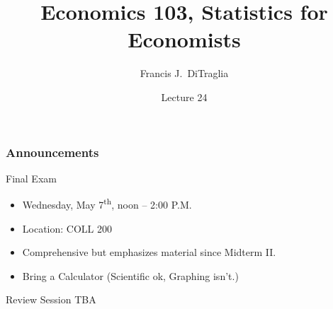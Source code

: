 \documentclass{beamer}
\title[Econ 103]{Economics 103, Statistics for Economists}
\author[F. DiTraglia]{Francis J.\ DiTraglia}
\institute{University of Pennsylvania}
\date{Lecture 24}
\begin{document}
 





\begin{frame}[plain]
	\titlepage 
	

\end{frame} 


\begin{frame}
\frametitle{Announcements}


\begin{block}{Final Exam}
\begin{itemize}
	\item Wednesday, May 7\textsuperscript{th}, noon -- 2:00 P.M.
	\item Location: COLL 200
 	\item Comprehensive but emphasizes material since Midterm II.
 	\item \alert{Bring a Calculator} (Scientific ok, Graphing isn't.)
\end{itemize}
\end{block}

\begin{block}{Review Session TBA}
	
\end{block}

\end{frame}
\end{document}
